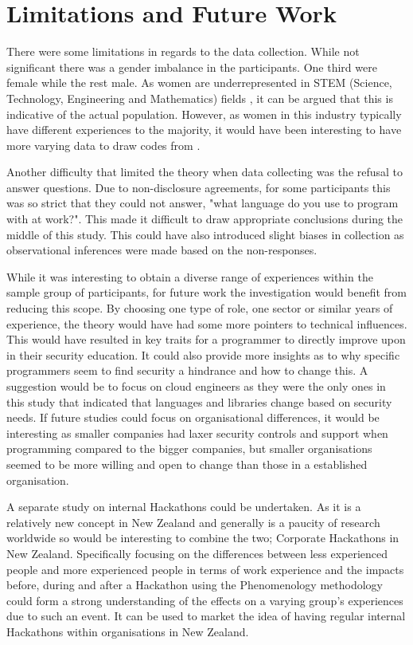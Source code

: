 \section{Limitations and Future Work} 

\par There were some limitations in regards to the data collection. While not significant there was a gender imbalance in the participants. One third were female while the rest male. As women are underrepresented in STEM (Science, Technology, Engineering and Mathematics) fields \cite{wit}, it can be argued that this is indicative of the actual population. However, as women in this industry typically have different experiences to the majority, it would have been interesting to have more varying data to draw codes from \cite{wit}. 
\newline
\par
Another difficulty that limited the theory when data collecting was the refusal to answer questions. Due to non-disclosure agreements, for some participants this was so strict that they could not answer, "what language do you use to program with at work?". This made it difficult to draw appropriate conclusions during the middle of this study. This could have also introduced slight biases in collection as observational inferences were made based on the non-responses. 
\newline
\par
While it was interesting to obtain a diverse range of experiences within the sample group of participants, for future work the investigation would benefit from reducing this scope. By choosing one type of role, one sector or similar years of experience, the theory would have had some more pointers to technical influences. This would have resulted in key traits for a programmer to directly improve upon in their security education. It could also provide more insights as to why specific programmers seem to find security a hindrance and how to change this. A suggestion would be to focus on cloud engineers as they were the only ones in this study that indicated that languages and libraries change based on security needs. If future studies could focus on organisational differences, it would be interesting as smaller companies had laxer security controls and support when programming compared to the bigger companies, but smaller organisations seemed to be more willing and open to change than those in a established organisation.
\newline
\par 
A separate study on internal Hackathons could be undertaken. As it is a relatively new concept in New Zealand and generally is a paucity of research worldwide so would be interesting to combine the two; Corporate Hackathons in New Zealand. Specifically focusing on the differences between less experienced people and more experienced people in terms of work experience and the impacts before, during and after a Hackathon using the Phenomenology methodology could form a strong understanding of the effects on a varying group's experiences due to such an event. It can be used to market the idea of having regular internal Hackathons within organisations in New Zealand. 


